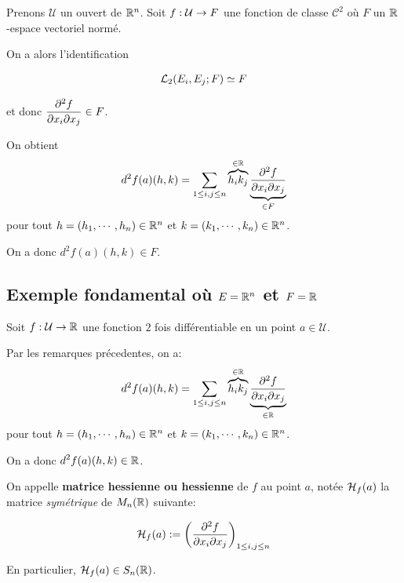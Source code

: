 Prenons $\mathcal{U}$ un ouvert de $\real^{n}$.
Soit $\GSfunction{f}{\mathcal{U}}{F}$ une fonction de classe $\mathcal{C}^{2}$ où
$F$ un $\real$-espace vectoriel normé.

On a alors l'identification

\begin{align*}
	\GScontinueHomo[2]{E_{i}, E_{j}}{F} \identification F
\end{align*}

et donc $ \displaystyle \pdv{f}{x_{i}}{x_{j}} (a) \in F$.

On obtient
\begin{equation*}
	d^{2}f(a) (h, k) = \displaystyle \sum_{1 \leq i, j \leq n} \overbrace{h_{i} k_{j}}^{\in
	\real} \underbrace{\pdv{f}{x_{i}}{x_{j}} (a)}_{\in F}
\end{equation*}
pour tout $h = (h_{1}, \cdots, h_{n}) \in \real^{n}$ et $k = (k_{1}, \cdots,
k_{n}) \in \real^{n}$.

On a donc $\displaystyle d^{2}f(a)(h, k) \in F$.



\subsection{Exemple fondamental où $E = \real^{n}$ et $F = \real$}

Soit $\GSfunction{f}{\mathcal{U}}{\real}$ une fonction $2$ fois différentiable
en un point $a \in \mathcal{U}$.

Par les remarques précedentes, on a:
\begin{equation*}
	d^{2}f(a) (h, k) = \displaystyle \sum_{1 \leq i, j \leq n} \overbrace{h_{i} k_{j}}^{\in
	\real} \underbrace{\pdv{f}{x_{i}}{x_{j}} (a)}_{\in \real}
\end{equation*}
pour tout $h = (h_{1}, \cdots, h_{n}) \in \real^{n}$ et $k = (k_{1}, \cdots,
k_{n}) \in \real^{n}$.

On a donc $\displaystyle d^{2}f(a)(h, k) \in \real$.

\begin{definition}
	On appelle \textbf{matrice hessienne ou hessienne} de $f$ au point $a$,
	notée $\hessienneMatrix{f}{a}$ la matrice \textit{symétrique} de
	$M_{n}(\real)$ suivante:

	\begin{equation*}
		\hessienneMatrix{f}{a} := \displaystyle
		\left(\pdv{f}{x_{i}}{x_{j}} (a) \right)_{1
		\leq i, j \leq n}
	\end{equation*}

	En particulier, $\hessienneMatrix{f}{a} \in S_{n}(\real)$.
\end{definition}

